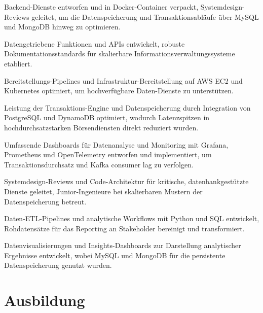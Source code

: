 \documentclass[10pt,a4paper]{resume}
\begin{document}
\bullets
  \item Backend-Dienste entworfen und in Docker-Container verpackt, Systemdesign-Reviews geleitet, um die Datenspeicherung und Transaktionsabläufe über MySQL und MongoDB hinweg zu optimieren.
  \item Datengetriebene Funktionen und APIs entwickelt, robuste Dokumentationsstandards für skalierbare Informationsverwaltungssysteme etabliert.
  \item Bereitstellungs-Pipelines und Infrastruktur-Bereitstellung auf AWS EC2 und Kubernetes optimiert, um hochverfügbare Daten-Dienste zu unterstützen.
\bulletsend
\vspace{1.5pt}
\bullets
  \item Leistung der Transaktions-Engine und Datenspeicherung durch Integration von PostgreSQL und DynamoDB optimiert, wodurch Latenzspitzen in hochdurchsatzstarken Börsendiensten direkt reduziert wurden.
  \item Umfassende Dashboards für Datenanalyse und Monitoring mit Grafana, Prometheus und OpenTelemetry entworfen und implementiert, um Transaktionsdurchsatz und Kafka consumer lag zu verfolgen.
  \item Systemdesign-Reviews und Code-Architektur für kritische, datenbankgestützte Dienste geleitet, Junior-Ingenieure bei skalierbaren Mustern der Datenspeicherung betreut.
\bulletsend
\vspace{1.5pt}
\bullets
  \item Daten-ETL-Pipelines und analytische Workflows mit Python und SQL entwickelt, Rohdatensätze für das Reporting an Stakeholder bereinigt und transformiert.
  \item Datenvisualisierungen und Insights-Dashboards zur Darstellung analytischer Ergebnisse entwickelt, wobei MySQL und MongoDB für die persistente Datenspeicherung genutzt wurden.
\bulletsend
\vspace{1.5pt}

\section{Ausbildung}

\vspace{2pt}
\end{document}
